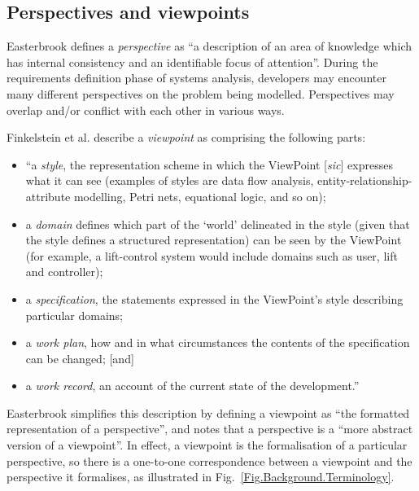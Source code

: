 \documentclass[11pt,oribibl]{llncs}
\begin{document}


\subsection{Perspectives and viewpoints}
\label{Sec:Background:Viewpoints:Perspectives}

Easterbrook \cite{East:SM:1991:PhD} defines a \emph{perspective} as ``a description of an area of knowledge which has internal consistency and an identifiable focus of attention''. During the requirements definition phase of systems analysis, developers may encounter many different perspectives on the problem being modelled. Perspectives may overlap and/or conflict with each other in various ways.

Finkelstein et al. \cite{Fink:ACW:1989} describe a \emph{viewpoint} as comprising the following parts:
\begin{itemize}
	\item ``a \emph{style}, the representation scheme in which the ViewPoint [\emph{sic}] expresses what it can see (examples of styles are data flow analysis, entity-relationship-attribute modelling, Petri nets, equational logic, and so on);
	\item a \emph{domain} defines which part of the `world' delineated in the style (given that the style defines a structured representation) can be seen by the ViewPoint (for example, a lift-control system would include domains such as user, lift and controller);
	\item a \emph{specification}, the statements expressed in the ViewPoint's style describing particular domains;
	\item a \emph{work plan}, how and in what circumstances the contents of the specification can be changed; [and]
	\item a \emph{work record}, an account of the current state of the development.''
\end{itemize}

Easterbrook \cite{East:SM:1991:PhD} simplifies this description by defining a viewpoint as ``the formatted representation of a perspective'', and notes that a perspective is a ``more abstract version of a viewpoint''. In effect, a viewpoint is the formalisation of a particular perspective, so there is a one-to-one correspondence between a viewpoint and the perspective it formalises, as illustrated in Fig.~\ref{Fig.Background.Terminology}.
\end{document}
